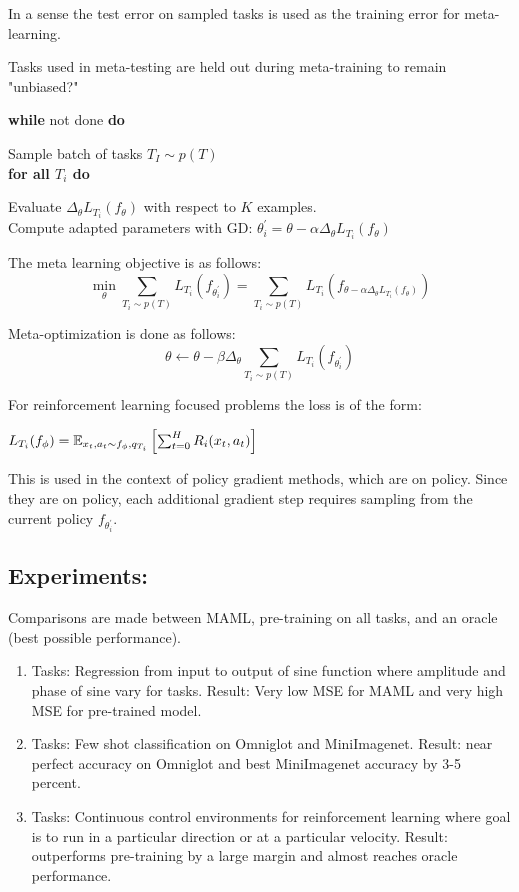 In a sense the test error on sampled tasks is used as the training error for meta-learning.

Tasks used in meta-testing are held out during meta-training to remain "unbiased?"

\textbf{while} not done \textbf{do}
\begin{block}
Sample batch of tasks $T_I \sim p(T)$ \\
\textbf{for all $T_i$ do} \\
    \begin{block}
    Evaluate $\Delta_{\theta}L_{T_i}(f_\theta)$ with respect to $K$ examples.\\
    Compute adapted parameters with GD: $\theta_{i}^{'} = \theta - \alpha \Delta_{\theta}L_{T_i}(f_\theta)$
    \end{block}
\end{block}

The meta learning objective is as follows:
$$\min_{\theta} \sum_{T_i \sim p(T)} L_{T_i}(f_{\theta_{i}^{'}}) =
\sum_{T_i \sim p(T)} L_{T_i}(f_{\theta - \alpha \Delta_{\theta}L_{T_i}(f_\theta)})$$

Meta-optimization is done as follows:
$$\theta \leftarrow \theta - \beta \Delta_{\theta} \sum_{T_i \sim p(T)} L_{T_i}(f_{\theta_{i}^{'}})$$

For reinforcement learning focused problems the loss is of the form:

$L_{T_i}(f_\phi) = {\mathbb E}_{x_t, a_t \sim f_\phi, q_{T_i}}\left[ \sum_{t=0}^{H} R_i(x_t, a_t)  \right]$

This is used in the context of policy gradient methods, which are on policy. Since they are
on policy, each additional gradient step requires sampling from the current policy $f_{\theta_{i}^{'}}$.

\subsection{Experiments:}

Comparisons are made between MAML, pre-training on all tasks, and an oracle (best possible performance).

\begin{enumerate}
    \item Tasks: Regression from input to output of sine function where amplitude and phase of sine vary for tasks.
          Result: Very low MSE for MAML and very high MSE for pre-trained model.
    \item Tasks: Few shot classification on Omniglot and MiniImagenet. Result: near perfect accuracy on Omniglot and
          best MiniImagenet accuracy by 3-5 percent.
    \item Tasks: Continuous control environments for reinforcement learning where goal is to run in a particular
          direction or at a particular velocity. Result: outperforms pre-training by a large margin and almost reaches
          oracle performance.
\end{enumerate}

